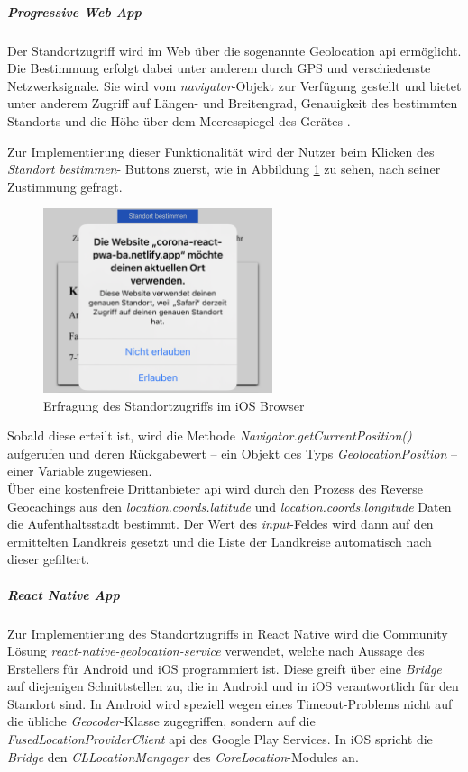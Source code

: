 \subparagraph{Progressive Web App\\}
Der Standortzugriff wird im Web über die sogenannte Geolocation \ac{api} ermöglicht.
Die Bestimmung erfolgt dabei unter anderem durch GPS und verschiedenste Netzwerksignale.
Sie wird vom \textit{navigator}-Objekt zur Verfügung gestellt und bietet unter anderem Zugriff auf Längen- und Breitengrad, Genauigkeit des bestimmten Standorts und die Höhe über dem Meeresspiegel des Gerätes \cite{Caceres.2021b}.

Zur Implementierung dieser Funktionalität wird der Nutzer beim Klicken des \textit{Standort bestimmen}- Buttons zuerst, wie in Abbildung \ref{fig:permission_safari} zu sehen, nach seiner Zustimmung gefragt.
\begin{figure}[h]
 \centering
 \includegraphics[width=0.6\textwidth]{figures/Permission_Safari.png}
 \caption{Erfragung des Standortzugriffs im iOS Browser}
 \label{fig:permission_safari}
\end{figure}

Sobald diese erteilt ist, wird die Methode \textit{Navigator.getCurrentPosition()} aufgerufen und deren Rückgabewert -- ein Objekt des Typs \textit{GeolocationPosition} -- einer Variable zugewiesen.\\
Über eine kostenfreie Drittanbieter \ac{api} wird durch den Prozess des Reverse Geocachings aus den \textit{location.coords.latitude} und \textit{location.coords.longitude} Daten die Aufenthaltsstadt bestimmt.
Der Wert des \textit{input}-Feldes wird dann auf den ermittelten Landkreis gesetzt und die Liste der Landkreise automatisch nach dieser gefiltert.

\subparagraph{React Native App\\}
Zur Implementierung des Standortzugriffs in React Native wird die Community Lösung \textit{react-native-geolocation-service} verwendet, welche nach Aussage des Erstellers für Android und iOS programmiert ist.
Diese greift über eine \textit{Bridge} auf diejenigen Schnittstellen zu, die in Android und in iOS verantwortlich für den Standort sind.
In Android wird speziell wegen eines Timeout-Problems nicht auf die übliche \textit{Geocoder}-Klasse zugegriffen, sondern auf die \textit{FusedLocationProviderClient} \ac{api} des Google Play Services. %
In iOS spricht die \textit{Bridge} den \textit{CLLocationMangager} des \textit{CoreLocation}-Modules an.

